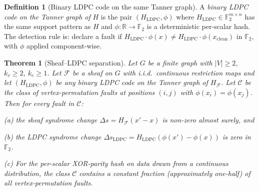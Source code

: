 \documentclass[12pt,a4paper]{article}
\theoremstyle{plain}
\newtheorem{theorem}{Theorem}
\theoremstyle{definition}
\newtheorem{definition}{Definition}
\begin{document}
\begin{definition}[Binary LDPC code on the same Tanner graph]
A \textit{binary LDPC code on the Tanner graph of} $H$ is the pair $(H_{\mathrm{LDPC}}, \phi)$ where $H_{\mathrm{LDPC}} \in \mathbb{F}_2^{m \times n}$ has the same support pattern as $H$ and $\phi : \mathbb{R} \to \mathbb{F}_2$ is a deterministic per-scalar hash. The detection rule is: declare a fault if $H_{\mathrm{LDPC}} \cdot \phi(x) \neq H_{\mathrm{LDPC}} \cdot \phi(x_{\mathrm{clean}})$ in $\mathbb{F}_2$, with $\phi$ applied component-wise.
\end{definition}

\begin{theorem}[Sheaf--LDPC separation]
\label{thm:separation}
Let $G$ be a finite graph with $|V| \geq 2$, $k_v \geq 2$, $k_e \geq 1$. Let $\mathcal{F}$ be a sheaf on $G$ with i.i.d.\ continuous restriction maps and let $(H_{\mathrm{LDPC}}, \phi)$ be any binary LDPC code on the Tanner graph of $H_\mathcal{F}$. Let $\mathcal{C}$ be the class of vertex-permutation faults at positions $(i, j)$ with $\phi(x_i) = \phi(x_j)$. Then for every fault in $\mathcal{C}$:

\textit{(a)} the sheaf syndrome change $\Delta s = H_\mathcal{F}(x' - x)$ is non-zero almost surely, and

\textit{(b)} the LDPC syndrome change $\Delta s_{\mathrm{LDPC}} = H_{\mathrm{LDPC}}(\phi(x') - \phi(x))$ is zero in $\mathbb{F}_2$.

\textit{(c)} For the per-scalar XOR-parity hash on data drawn from a continuous distribution, the class $\mathcal{C}$ contains a constant fraction (approximately one-half) of all vertex-permutation faults.
\end{theorem}
\end{document}
